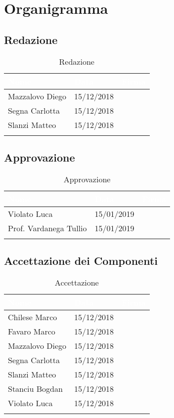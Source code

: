 \section{Organigramma}


\subsection{Redazione}

\begin{longtable}{|C{.25\textwidth}|C{.16\textwidth}|C{.45\textwidth}|}
\hline
{}\textbf{\textcolor{white}{Nome}} & \textbf{\textcolor{white}{Data}} & \textbf{\textcolor{white}{Firma}}\\
\hline \hline
\endfirsthead
Mazzalovo Diego & 15/12/2018 &  \\
\hline
{}Segna Carlotta & 15/12/2018 & \\
\hline
Slanzi Matteo & 15/12/2018 & \\
\hline
\caption{Redazione}
\label{Tabella Redazione}
\end{longtable}


\subsection{Approvazione}

\begin{longtable}{|C{.25\textwidth}|C{.16\textwidth}|C{.45\textwidth}|}
\hline
{}\textbf{\textcolor{white}{Nome}} & \textbf{\textcolor{white}{Data}} & \textbf{\textcolor{white}{Firma}}\\
\hline \hline
\endfirsthead
Violato Luca & 15/01/2019 &  \\
\hline
{}Prof. Vardanega Tullio & 15/01/2019 & \\
\hline
\caption{Approvazione}
\label{Tabella Approvazione}
\end{longtable}

\subsection{Accettazione dei Componenti}

\begin{longtable}{|C{.25\textwidth}|C{.16\textwidth}|C{.45\textwidth}|}
\hline
{}\textbf{\textcolor{white}{Nome}} & \textbf{\textcolor{white}{Data}} & \textbf{\textcolor{white}{Firma}}\\
\hline \hline
\endfirsthead
Chilese Marco & 15/12/2018 &  \\
\hline
{}Favaro Marco & 15/12/2018 &  \\
\hline
Mazzalovo Diego & 15/12/2018 &  \\
\hline
{}Segna Carlotta & 15/12/2018 &  \\
\hline
Slanzi Matteo & 15/12/2018 &  \\
\hline
{}Stanciu Bogdan & 15/12/2018 &  \\
\hline
Violato Luca & 15/12/2018 & \\
\hline
\caption{Accettazione}
\label{Tabella Accettazione}
\end{longtable}

